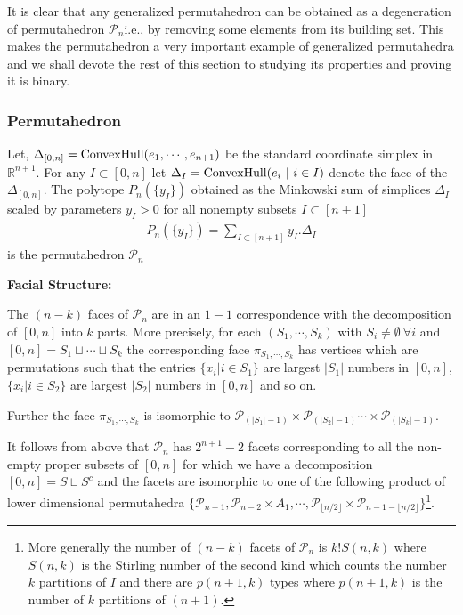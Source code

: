 \documentclass[hidelinks,12pt]{article}
\newcommand{\bea}[1]{\begin{eqnarray}\label{#1} }
\newcommand{\eea}{\end{eqnarray}}
\def\bea{\begin{eqnarray}}
\def\eea{\end{eqnarray}}
\begin{document}
It is clear that any  generalized permutahedron can be obtained as a degeneration of  permutahedron ${\mathscr P_n}$i.e., by removing some elements from its building set. This makes the permutahedron a very important example of generalized permutahedra and we shall devote the rest of this section to studying its properties and proving it is binary.
\subsubsection*{Permutahedron}

Let, $\Delta_{[0,n]} = {\rm ConvexHull}(e_1,\cdots,e_{n+1})$ be the standard coordinate simplex in $\mathbb{R}^{n+1}$. For any $I \subset [0,n] $ let $\Delta_I ={\rm ConvexHull}(e_i~|~i\in I)$ denote the face of the $\Delta_{[0,n]}$. The polytope $P_n(\{y_I \})$ obtained as the Minkowski sum of simplices $\Delta_I$ scaled by  parameters $y_I > 0$ for all nonempty subsets $I \subset [n+1]$
 \bea
 P_n(\{y_I \})= \sum_{I \subset[n+1]} y_I . \Delta_I  
 \eea
 is the permutahedron ${\mathscr P_n}$

{\bf Facial Structure:} 

The $(n-k)$ faces of ${\mathscr P_n}$ are in an $1-1$ correspondence with the decomposition of $[0,n]$ into $k$ parts. More precisely, for each $(S_1,\cdots,S_k)$ with $S_i \neq \emptyset ~ \forall i$ and $[0,n] = S_1 \sqcup \cdots \sqcup S_k$ the corresponding face $\pi_{S_1,\cdots,S_k}$ has vertices which are permutations such that the entries $ \{x_i | i \in S_1 \}$ are largest $|S_1|$ numbers in $[0,n]$, $\{x_i | i \in S_2 \}$ are largest $|S_2|$ numbers in $[0,n]$ and so on. 

Further the face $\pi_{S_1,\cdots,S_k}$   is isomorphic to ${\mathscr P_{\left(| S_1|-1\right)} }\times {\mathscr P_{\left(| S_2|-1\right)} } \cdots \times{\mathscr P_{\left(| S_k|-1\right)} } $.

It follows from above that ${\mathscr P_n}$ has $2^{n+1} -2$ facets corresponding to all the non-empty proper subsets of $[0,n]$ for which we have a decomposition $[0,n] = S \sqcup S^c$ and the facets are isomorphic to one of the following product of lower dimensional permutahedra  $ \{ {\mathscr P_{n-1}}, {\mathscr P_{n-2}} \times A_1, \cdots ,{\mathscr P_{\lfloor{n/2 \rfloor}}} \times {\mathscr P_{n-1-\lfloor n/2 \rfloor}}  \} $\footnote {More generally the number of $(n-k)$ facets of ${\mathscr P_n}$ is $ k! S(n,k)$ where $S(n,k)$ is the Stirling number of the second kind which counts the number $k$ partitions of  $I$ and there are $p(n+1,k)$ types where $p(n+1,k)$ is the number of $k$ partitions of $(n+1)$.}.
\end{document}

